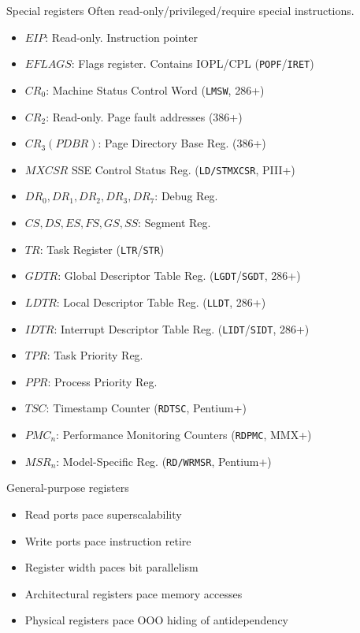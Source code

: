 \documentclass[mathserif,xcolor={dvipsnames,table}]{beamer}
\begin{document}
\begin{frame}{Special registers}
Often read-only/privileged/require special instructions.
\tiny{
\begin{itemize}
\item $EIP$: Read-only. Instruction pointer
\item $EFLAGS$: Flags register. Contains IOPL/CPL (\texttt{POPF}/\texttt{IRET})
\item $CR_0$: Machine Status Control Word (\texttt{LMSW}, 286+)
\item $CR_2$: Read-only. Page fault addresses (386+)
\item $CR_3 (PDBR)$: Page Directory Base Reg. (386+)
\item $MXCSR$ SSE Control Status Reg. (\texttt{LD/STMXCSR}, PIII+)
\item $DR_0, DR_1, DR_2, DR_3, DR_7$: Debug Reg.
\item $CS, DS, ES, FS, GS, SS$: Segment Reg.
\item $TR$: Task Register (\texttt{LTR}/\texttt{STR})
\item $GDTR$: Global Descriptor Table Reg. (\texttt{LGDT}/\texttt{SGDT}, 286+)
\item $LDTR$: Local Descriptor Table Reg. (\texttt{LLDT}, 286+)
\item $IDTR$: Interrupt Descriptor Table Reg. (\texttt{LIDT}/\texttt{SIDT}, 286+)
\item $TPR$: Task Priority Reg.
\item $PPR$: Process Priority Reg.
\item $TSC$: Timestamp Counter (\texttt{RDTSC}, Pentium+)
\item $PMC_n$: Performance Monitoring Counters (\texttt{RDPMC}, MMX+)
\item $MSR_n$: Model-Specific Reg. (\texttt{RD/WRMSR}, Pentium+)
\end{itemize}
}
\end{frame}

\begin{frame}{General-purpose registers}
\begin{itemize}
\item Read ports pace superscalability
\item Write ports pace instruction retire
\item Register width paces bit parallelism
\item Architectural registers pace memory accesses
\item Physical registers pace OOO hiding of antidependency
\end{itemize}
\end{frame}
\end{document}

